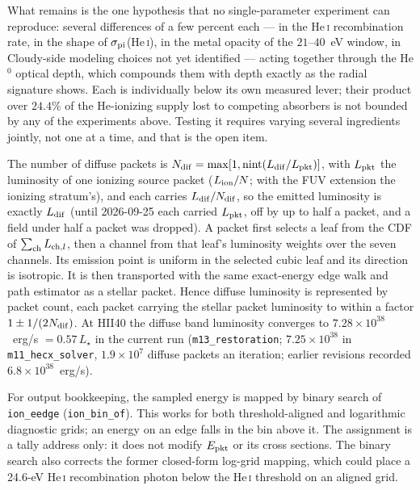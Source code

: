 \documentclass[english,a4paper]{my_memo}
\newcommand{\code}[1]{\texttt{#1}}
\begin{document}
What remains is the one hypothesis that no single-parameter experiment can
reproduce: several differences of a few percent each --- in the He\,\textsc{i}
recombination rate, in the shape of $\sigma_{\rm pi}$(He\,\textsc{i}), in the
metal opacity of the $21$--$40$~eV window, in Cloudy-side modeling choices
not yet identified --- acting together through the He$^0$ optical depth,
which compounds them with depth exactly as the radial signature shows.  Each
is individually below its own measured lever; their product over $24.4\%$ of
the He-ionizing supply lost to competing absorbers is not bounded by any of
the experiments above.  Testing it requires varying several ingredients
jointly, not one at a time, and that is the open item.

The number of diffuse packets is $N_{\rm dif} = \max[1,
\mathrm{nint}(L_{\rm dif}/L_{\rm pkt})]$, with $L_{\rm pkt}$ the luminosity
of one ionizing source packet ($L_{\rm ion}/N$; with the FUV extension the
ionizing stratum's), and each carries $L_{\rm dif}/N_{\rm dif}$, so the
emitted luminosity is exactly $L_{\rm dif}$ (until 2026-09-25 each carried
$L_{\rm pkt}$, off by up to half a packet, and a field under half a packet
was dropped).  A packet first selects a leaf from the CDF of
$\sum_{\rm ch}L_{{\rm ch},l}$, then a channel from that leaf's luminosity
weights over the seven channels.  Its emission point is
uniform in the selected cubic leaf and its direction is isotropic.  It is
then transported with the same exact-energy edge walk and path estimator as
a stellar packet.  Hence diffuse luminosity is represented by packet count,
each packet carrying the stellar packet luminosity to within a factor
$1 \pm 1/(2N_{\rm dif})$.  At HII40 the diffuse band luminosity
converges to $7.28{\times}10^{38}$~erg/s $=0.57\,L_\star$ in the current
run (\code{m13\_restoration}; $7.25{\times}10^{38}$ in \code{m11\_hecx\_solver},
$1.9{\times}10^7$ diffuse packets an iteration; earlier revisions recorded
$6.8{\times}10^{38}$~erg/s).

For output bookkeeping, the sampled energy is
mapped by binary search of \code{ion\_eedge} (\code{ion\_bin\_of}).  This
works for both threshold-aligned and logarithmic diagnostic grids; an energy
on an edge falls in the bin above it.  The assignment is a tally address
only: it does not modify $E_{\rm pkt}$ or its cross sections.  The
binary search also corrects the former closed-form log-grid mapping, which
could place a 24.6-eV He\,\textsc{i} recombination photon below the
He\,\textsc{i} threshold on an aligned grid.
\end{document}

